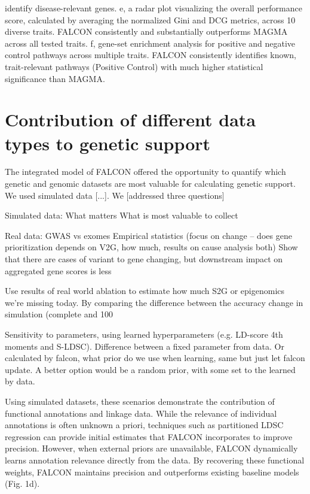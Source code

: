 identify disease-relevant genes. e, a radar plot visualizing the overall performance score, calculated by averaging the normalized Gini and DCG metrics, across 10 diverse traits. FALCON consistently and substantially outperforms MAGMA across all tested traits. f, gene-set enrichment analysis for positive and negative control pathways across multiple traits. FALCON consistently identifies known, trait-relevant pathways (Positive Control) with much higher statistical significance than MAGMA.

\section{Contribution of different data types to genetic support}
\label{sec:data_types}
The integrated model of FALCON offered the opportunity to quantify which genetic and genomic datasets are most valuable for calculating genetic support. We used simulated data [...]. We [addressed three questions]

Simulated data: What matters What is most valuable to collect

Real data: GWAS vs exomes Empirical statistics (focus on change – does gene prioritization depends on V2G, how much, results on cause analysis both) Show that there are cases of variant to gene changing, but downstream impact on aggregated gene scores is less

Use results of real world ablation to estimate how much S2G or epigenomics we’re missing today. By comparing the difference between the accuracy change in simulation (complete and 100%

Sensitivity to parameters, using learned hyperparameters (e.g. LD-score 4th moments and S-LDSC). Difference between a fixed parameter from data. Or calculated by falcon, what prior do we use when learning, same but just let falcon update. A better option would be a random prior, with some set to the learned by data.

Using simulated datasets, these scenarios demonstrate the contribution of functional annotations and linkage data. While the relevance of individual annotations is often unknown a priori, techniques such as partitioned LDSC regression can provide initial estimates that FALCON incorporates to improve precision. However, when external priors are unavailable, FALCON dynamically learns annotation relevance directly from the data. By recovering these functional weights, FALCON maintains precision and outperforms existing baseline models (Fig. 1d).
